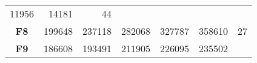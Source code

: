 \documentclass[12pt,a4paper]{article}
\begin{document}
\begin{longtable}[c]{@{}crrrrrr@{}}
\begin{minipage}[t]{0.10\columnwidth}
11956
\strut\end{minipage} &
\begin{minipage}[t]{0.11\columnwidth}\raggedleft\strut
14181
\strut\end{minipage} &
\begin{minipage}[t]{0.07\columnwidth}\raggedleft\strut
44
\strut\end{minipage}\tabularnewline
\begin{minipage}[t]{0.11\columnwidth}\centering\strut
\textbf{F8}
\strut\end{minipage} &
\begin{minipage}[t]{0.08\columnwidth}\raggedleft\strut
199648
\strut\end{minipage} &
\begin{minipage}[t]{0.08\columnwidth}\raggedleft\strut
237118
\strut\end{minipage} &
\begin{minipage}[t]{0.09\columnwidth}\raggedleft\strut
282068
\strut\end{minipage} &
\begin{minipage}[t]{0.10\columnwidth}\raggedleft\strut
327787
\strut\end{minipage} &
\begin{minipage}[t]{0.11\columnwidth}\raggedleft\strut
358610
\strut\end{minipage} &
\begin{minipage}[t]{0.07\columnwidth}\raggedleft\strut
27
\strut\end{minipage}\tabularnewline
\begin{minipage}[t]{0.11\columnwidth}\centering\strut
\textbf{F9}
\strut\end{minipage} &
\begin{minipage}[t]{0.08\columnwidth}\raggedleft\strut
186608
\strut\end{minipage} &
\begin{minipage}[t]{0.08\columnwidth}\raggedleft\strut
193491
\strut\end{minipage} &
\begin{minipage}[t]{0.09\columnwidth}\raggedleft\strut
211905
\strut\end{minipage} &
\begin{minipage}[t]{0.10\columnwidth}\raggedleft\strut
226095
\strut\end{minipage} &
\begin{minipage}[t]{0.11\columnwidth}\raggedleft\strut
235502
\strut\end{minipage} &
\begin{minipage}[t]{0.07\columnwidth}\raggedleft\strut

\end{minipage}
\end{longtable}
\end{document}
